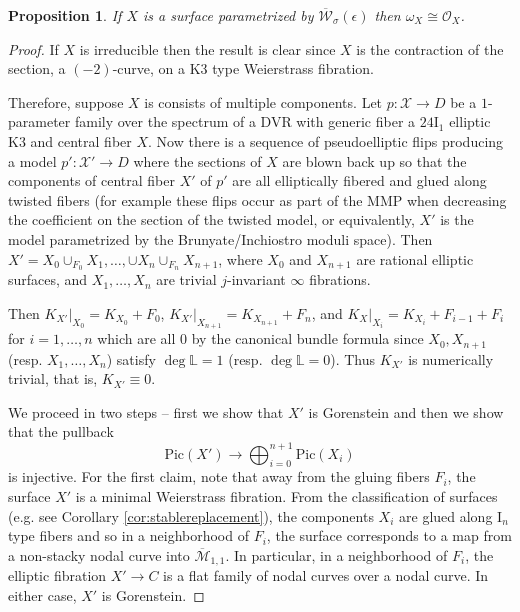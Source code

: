 \documentclass[11pt]{amsart}
\newtheorem{prop}[theorem]{Proposition}
\theoremstyle{definition}
\theoremstyle{remark}
\newcounter{step}
\newcommand{\LL}{{\mathbb L}}
\newcommand{\calO}{\mathcal O}
\newcommand{\calM}{\mathcal M}
\newcommand{\Pic}{\mathrm{Pic}}
\newcommand{\kepsilon}{\overline{\mathcal{W}}_\sigma(\epsilon)}
\begin{document}
	
	\begin{prop}\label{prop:nomarkingcanonical}
		If $X$ is a surface parametrized by $\kepsilon$ then $\omega_X \cong \calO_X$.
	\end{prop}
	\begin{proof}
		
		If $X$ is irreducible then the result is clear since $X$ is the contraction of the section, a $(-2)$-curve, on a K3 type Weierstrass fibration. 
		
		Therefore, suppose $X$ is consists of multiple components. Let $p:\mathscr{X} \to D$ be a $1$-parameter family over the spectrum of a DVR with generic fiber a $24\mathrm{I}_1$ elliptic K3 and central fiber $X$. Now there is a sequence of pseudoelliptic flips producing a model $p':\mathscr{X}' \to D$ where the sections of $X$ are blown back up so that the components of central fiber $X'$ of $p'$ are all elliptically fibered and glued along twisted fibers (for example these flips occur as part of the MMP when decreasing the coefficient on the section of the twisted model, or equivalently, $X'$ is the model parametrized by the Brunyate/Inchiostro moduli space). Then $X' = X_0 \cup_{F_0} X_1, \ldots, \cup X_n \cup_{F_n} X_{n+1}$, where $X_0$ and $X_{n+1}$ are rational elliptic surfaces, and $X_1, \ldots, X_n$ are trivial $j$-invariant $\infty$ fibrations. 
		
		Then $K_{X'}|_{X_0} = K_{X_0} + F_0$, $K_{X'}|_{X_{n+1}} = K_{X_{n + 1}} + F_n$, and $K_X|_{X_i} = K_{X_i} + F_{i-1} + F_i$ for $i = 1, \ldots, n$ which are all $0$ by the canonical bundle formula since $X_0, X_{n+1}$ (resp. $X_1, \ldots, X_n$) satisfy $\deg \LL = 1$ (resp. $\deg \LL = 0$). Thus $K_{X'}$ is numerically trivial, that is, $K_{X'} \equiv 0$. 
		
		We proceed in two steps -- first we show that $X'$ is Gorenstein and then we show that the pullback
		\begin{equation}\label{eqpic}
			\Pic(X') \to \bigoplus_{i = 0}^{n+1} \Pic(X_i)
		\end{equation}
		is injective. For the first claim, note that away from the gluing fibers $F_i$, the surface $X'$ is a minimal Weierstrass fibration. From the classification of surfaces (e.g. see Corollary \ref{cor:stablereplacement}), the components $X_i$ are glued along $\mathrm{I}_n$ type fibers and so in a neighborhood of $F_i$, the surface corresponds to a map from a non-stacky nodal curve into $\overline{\calM}_{1,1}$. In particular, in a neighborhood of $F_i$, the elliptic fibration $X' \to C$ is a flat family of nodal curves over a nodal curve. In either case, $X'$ is Gorenstein. 
		

\end{proof}
\end{document}
